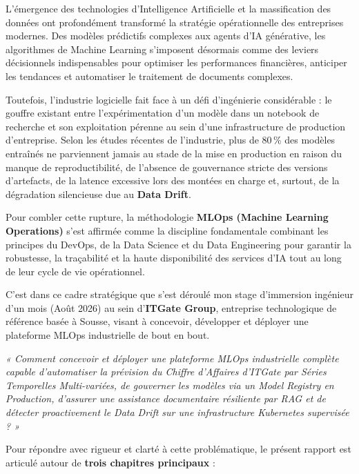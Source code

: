 \documentclass[11pt,a4paper,oneside]{report}
\begin{document}
L'émergence des technologies d'Intelligence Artificielle et la massification des données ont profondément transformé la stratégie opérationnelle des entreprises modernes. Des modèles prédictifs complexes aux agents d'IA générative, les algorithmes de Machine Learning s'imposent désormais comme des leviers décisionnels indispensables pour optimiser les performances financières, anticiper les tendances et automatiser le traitement de documents complexes.

Toutefois, l'industrie logicielle fait face à un défi d'ingénierie considérable : le gouffre existant entre l'expérimentation d'un modèle dans un notebook de recherche et son exploitation pérenne au sein d'une infrastructure de production d'entreprise. Selon les études récentes de l'industrie, plus de 80\,\% des modèles entraînés ne parviennent jamais au stade de la mise en production en raison du manque de reproductibilité, de l'absence de gouvernance stricte des versions d'artefacts, de la latence excessive lors des montées en charge et, surtout, de la dégradation silencieuse due au \textbf{Data Drift}.

Pour combler cette rupture, la méthodologie \textbf{MLOps (Machine Learning Operations)} s'est affirmée comme la discipline fondamentale combinant les principes du DevOps, de la Data Science et du Data Engineering pour garantir la robustesse, la traçabilité et la haute disponibilité des services d'IA tout au long de leur cycle de vie opérationnel.

C'est dans ce cadre stratégique que s'est déroulé mon stage d'immersion ingénieur d'un mois (Août 2026) au sein d'\textbf{ITGate Group}, entreprise technologique de référence basée à Sousse, visant à concevoir, développer et déployer une plateforme MLOps industrielle de bout en bout.

\begin{problembox}
\centering
\itshape\small
« Comment concevoir et déployer une plateforme MLOps industrielle complète capable d'automatiser la prévision du Chiffre d'Affaires d'ITGate par Séries Temporelles Multi-variées, de gouverner les modèles via un Model Registry en Production, d'assurer une assistance documentaire résiliente par RAG et de détecter proactivement le Data Drift sur une infrastructure Kubernetes supervisée ? »
\end{problembox}

Pour répondre avec rigueur et clarté à cette problématique, le présent rapport est articulé autour de \textbf{trois chapitres principaux} :
\end{document}
